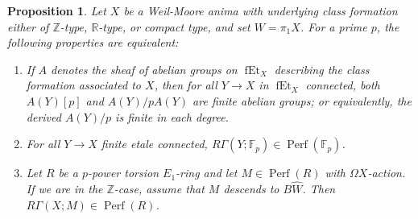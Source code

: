 \documentclass[12pt]{article}
\newtheorem{proposition}[theorem]{Proposition}
\theoremstyle{definition}
\newcommand{\on}{\operatorname}
\newcommand{\mbb}{\mathbb}
\newcommand{\wh}{\widehat}
\begin{document}
\begin{proposition}\label{pfinite}
Let $X$ be a Weil-Moore anima with underlying class formation either of $\mbb{Z}$-type, $\mbb{R}$-type, or compact type, and set $W=\pi_1X$.  For a prime $p$, the following properties are equivalent:
\begin{enumerate}
\item If $A$ denotes the sheaf of abelian groups on $\on{fEt}_X$ describing the class formation associated to $X$, then for all $Y\to X$ in $\on{fEt}_X$ connected, both $A(Y)[p]$ and $A(Y)/pA(Y)$ are finite abelian groups; or equivalently, the derived $A(Y)/p$ is finite in each degree.
\item For all $Y\to X$ finite etale connected, $R\Gamma(Y;\mbb{F}_p)\in\on{Perf}(\mbb{F}_p)$.
\item Let $R$ be a $p$-power torsion $E_1$-ring and let $M\in \on{Perf}(R)$ with $\Omega X$-action.  If we are in the $\mbb{Z}$-case, assume that $M$ descends to $B\wh{W}$.  Then $R\Gamma(X;M)\in \on{Perf}(R)$.
\end{enumerate}
\end{proposition}
\end{document}
